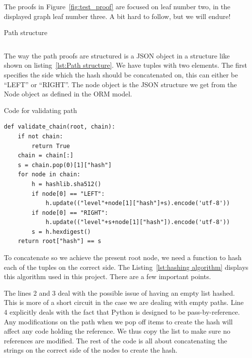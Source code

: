 \documentclass[../Main/thesis.tex]{subfiles}
\begin{document}
The proofs in Figure~\ref{fig:test_proof} are focused on leaf number two, in the
displayed graph leaf number three. A bit hard to follow, but we will endure!

\begin{listing}[H]
\caption{Path structure}
\label{lst:Path structure}
\begin{equation*}
    [(\text{Side},\ \text{NodeObject}),\ (\text{Side},\ \text{NodeObject})\ \dots]
\end{equation*}
\end{listing}

The way the path proofs are structured is a JSON object in a structure like
shown on listing~\ref{lst:Path structure}. We have tuples with two elements. The
first specifies the side which the hash should be concatenated on, this can
either be ``LEFT'' or ``RIGHT''. The node object is the JSON structure we get
from the Node object as defined in the ORM model.

\begin{listing}[H]
\caption{Code for validating path}
\label{lst:hashing algorithm}
\begin{verbatim}
def validate_chain(root, chain):
    if not chain:
        return True
    chain = chain[:]
    s = chain.pop(0)[1]["hash"]
    for node in chain:
        h = hashlib.sha512()
        if node[0] == "LEFT":
            h.update(("level"+node[1]["hash"]+s).encode('utf-8'))
        if node[0] == "RIGHT":
            h.update(("level"+s+node[1]["hash"]).encode('utf-8'))
        s = h.hexdigest()
    return root["hash"] == s
\end{verbatim}
\end{listing}

To concatenate so we achieve the present root node, we need a function to hash
each of the tuples on the correct side. The Listing~\ref{lst:hashing algorithm}
displays this algorithm used in this project. There are a few important points.

The lines 2 and 3 deal with the possible issue of having an empty list hashed.
This is more of a short circuit in the case we are dealing with empty paths.
Line 4 explicitly deals with the fact that Python is designed to be
pass-by-reference. Any modifications on the path when we pop off items to create
the hash will affect any code holding the reference. We thus copy the list to
make sure no references are modified. The rest of the code is all about
concatenating the strings on the correct side of the nodes to create the hash.
\end{document}
